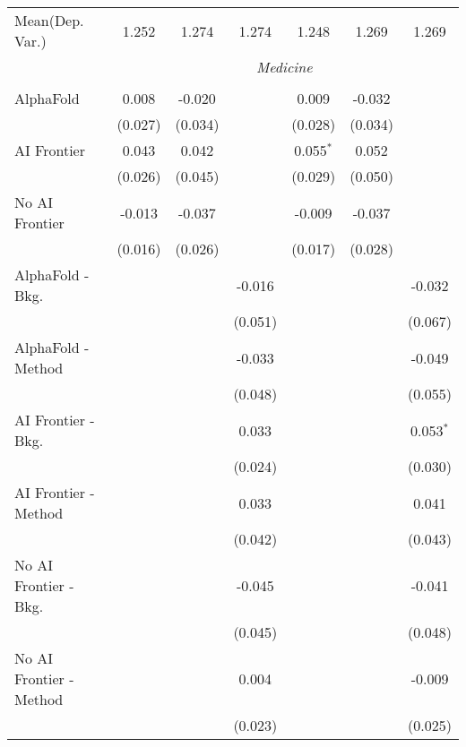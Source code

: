 \begin{tabular}{lcccccc}
Mean(Dep. Var.) & 1.252 & 1.274 & 1.274 & 1.248 & 1.269 & 1.269 \\
 & \multicolumn{6}{c}{\textit{Medicine}} \\ \\
   AlphaFold               & 0.008   & -0.020  &         & 0.009       & -0.032  &   \\   
                           & (0.027) & (0.034) &         & (0.028)     & (0.034) &   \\   
   AI Frontier             & 0.043   & 0.042   &         & 0.055$^{*}$ & 0.052   &   \\   
                           & (0.026) & (0.045) &         & (0.029)     & (0.050) &   \\   
   No AI Frontier          & -0.013  & -0.037  &         & -0.009      & -0.037  &   \\   
                           & (0.016) & (0.026) &         & (0.017)     & (0.028) &   \\   
   AlphaFold - Bkg.        &         &         & -0.016  &             &         & -0.032\\   
                           &         &         & (0.051) &             &         & (0.067)\\   
   AlphaFold - Method      &         &         & -0.033  &             &         & -0.049\\   
                           &         &         & (0.048) &             &         & (0.055)\\   
   AI Frontier - Bkg.      &         &         & 0.033   &             &         & 0.053$^{*}$\\   
                           &         &         & (0.024) &             &         & (0.030)\\   
   AI Frontier - Method    &         &         & 0.033   &             &         & 0.041\\   
                           &         &         & (0.042) &             &         & (0.043)\\   
   No AI Frontier - Bkg.   &         &         & -0.045  &             &         & -0.041\\   
                           &         &         & (0.045) &             &         & (0.048)\\   
   No AI Frontier - Method &         &         & 0.004   &             &         & -0.009\\   
                           &         &         & (0.023) &             &         & (0.025)\\   

\end{tabular}
